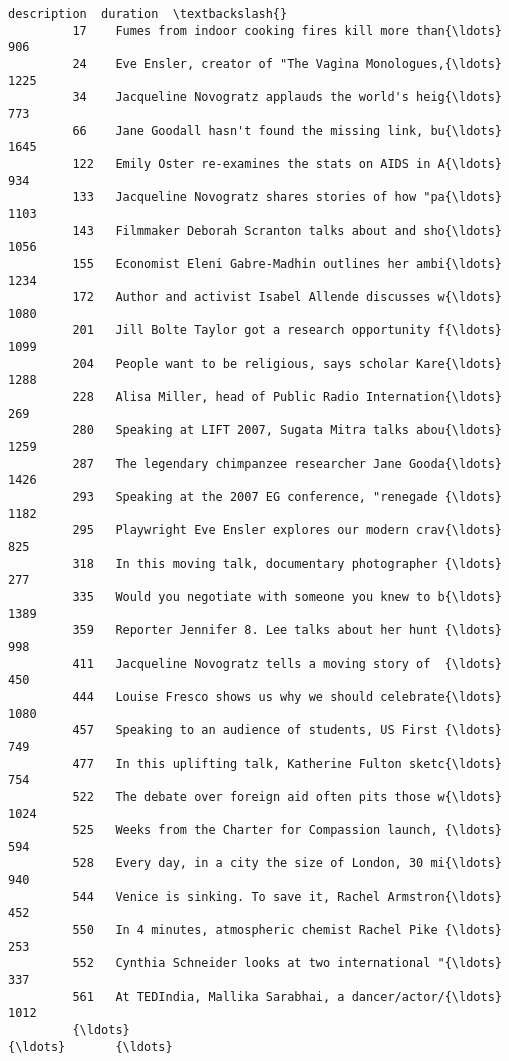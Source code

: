 \documentclass[11pt]{article}
\begin{document}
\begin{Verbatim}[commandchars=\\\{\}]
                                                     description  duration  \textbackslash{}
         17    Fumes from indoor cooking fires kill more than{\ldots}       906   
         24    Eve Ensler, creator of "The Vagina Monologues,{\ldots}      1225   
         34    Jacqueline Novogratz applauds the world's heig{\ldots}       773   
         66    Jane Goodall hasn't found the missing link, bu{\ldots}      1645   
         122   Emily Oster re-examines the stats on AIDS in A{\ldots}       934   
         133   Jacqueline Novogratz shares stories of how "pa{\ldots}      1103   
         143   Filmmaker Deborah Scranton talks about and sho{\ldots}      1056   
         155   Economist Eleni Gabre-Madhin outlines her ambi{\ldots}      1234   
         172   Author and activist Isabel Allende discusses w{\ldots}      1080   
         201   Jill Bolte Taylor got a research opportunity f{\ldots}      1099   
         204   People want to be religious, says scholar Kare{\ldots}      1288   
         228   Alisa Miller, head of Public Radio Internation{\ldots}       269   
         280   Speaking at LIFT 2007, Sugata Mitra talks abou{\ldots}      1259   
         287   The legendary chimpanzee researcher Jane Gooda{\ldots}      1426   
         293   Speaking at the 2007 EG conference, "renegade {\ldots}      1182   
         295   Playwright Eve Ensler explores our modern crav{\ldots}       825   
         318   In this moving talk, documentary photographer {\ldots}       277   
         335   Would you negotiate with someone you knew to b{\ldots}      1389   
         359   Reporter Jennifer 8. Lee talks about her hunt {\ldots}       998   
         411   Jacqueline Novogratz tells a moving story of  {\ldots}       450   
         444   Louise Fresco shows us why we should celebrate{\ldots}      1080   
         457   Speaking to an audience of students, US First {\ldots}       749   
         477   In this uplifting talk, Katherine Fulton sketc{\ldots}       754   
         522   The debate over foreign aid often pits those w{\ldots}      1024   
         525   Weeks from the Charter for Compassion launch, {\ldots}       594   
         528   Every day, in a city the size of London, 30 mi{\ldots}       940   
         544   Venice is sinking. To save it, Rachel Armstron{\ldots}       452   
         550   In 4 minutes, atmospheric chemist Rachel Pike {\ldots}       253   
         552   Cynthia Schneider looks at two international "{\ldots}       337   
         561   At TEDIndia, Mallika Sarabhai, a dancer/actor/{\ldots}      1012   
         {\ldots}                                                 {\ldots}       {\ldots}   

\end{Verbatim}
\end{document}
